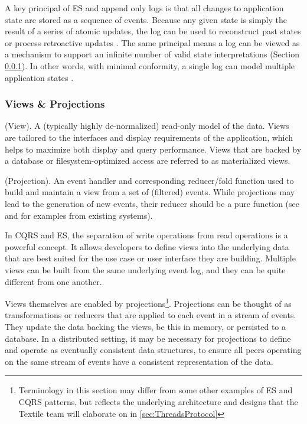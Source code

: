 \documentclass{textile}
\begin{document}
A key principal of ES and append only logs is that all changes to application state are stored as a sequence of events. Because any given state is simply the result of a series of atomic updates, the log can be used to reconstruct past states or process retroactive updates \cite{fowlerEventSourcing}. The same principal means a log can be viewed as a mechanism to support an infinite number of valid state interpretations (Section  \ref{sec:ViewsProjections}). In other words, with minimal conformity, a single log can model multiple application states \cite{microsoftcorporationAzureApplicationArchitecture}.

\subsubsection{Views \& Projections} \label{sec:ViewsProjections}

\begin{definition}  (View). A (typically highly de-normalized) read-only model of the data. Views are tailored to the interfaces and display requirements of the application, which helps to maximize both display and query performance. Views that are backed by a database or filesystem-optimized access are referred to as materialized views. \end{definition}

\begin{definition} (Projection). An event handler and corresponding reducer/fold function used to build and maintain a view from a set of (filtered) events. While projections may lead to the generation of new events, their reducer should be a pure function (see \cite{eventsourceEventSourcingBasics} and \cite{reduxGettingStartedRedux} for examples from existing systems). \end{definition}

In CQRS and ES, the separation of write operations from read operations is a powerful concept. It allows developers to define views into the underlying data that are best suited for the use case or user interface they are building. Multiple views can be built from the same underlying event log, and they can be quite different from one another.

Views themselves are enabled by projections\footnote{Terminology in this section may differ from some other examples of ES and CQRS patterns, but reflects the underlying architecture and designs that the Textile team will elaborate on in \ref{sec:ThreadsProtocol}}. Projections can be thought of as transformations or reducers that are applied to each event in a stream of events. They update the data backing the views, be this in memory, or persisted to a database. In a distributed setting, it may be necessary for projections to define and operate as eventually consistent data structures, to ensure all peers operating on the same stream of events have a consistent representation of the data.
\end{document}
